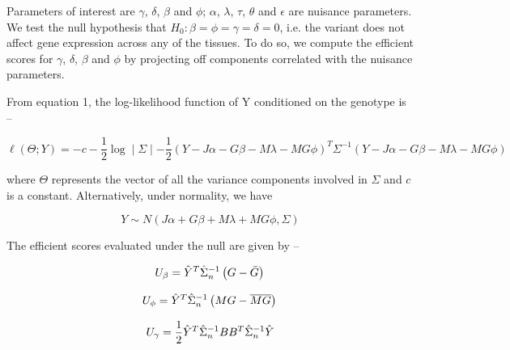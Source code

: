\documentclass[hidelinks]{article}
\begin{document}
Parameters of interest are $\gamma$, $\delta$, $\beta$ and $\phi$; $\alpha$, $\lambda$, $\tau$, $\theta$ and $\epsilon$ are nuisance parameters. We test the null hypothesis that $H_0: \beta = \phi = \gamma =  \delta = 0$, i.e. the variant does not affect gene expression across any of the tissues. To do so, we compute the efficient scores for $\gamma$, $\delta$, $\beta$ and $\phi$ by projecting off components correlated with the nuisance parameters. 


%
%

From equation 1, the log-likelihood function of Y conditioned on the genotype is --

\begin{equation}
\ell \left( \Theta ;Y \right) =  - c - \frac{1}{2} \log \mid \Sigma \mid - \frac{1}{2} \left( Y  - J \alpha - G\beta - M\lambda - MG\phi \right )^T \Sigma ^{-1} \left( Y  - J \alpha - G\beta - M\lambda - MG\phi \right )
\end{equation}

where $\Theta$ represents the vector of all the variance components involved in $\Sigma$ and $c$ is a constant. Alternatively, under normality, we have

\[
Y \sim N( J\alpha + G\beta + M\lambda + MG\phi,\Sigma )
\]

The efficient scores evaluated under the null are given by --

\begingroup
\large
\begin{equation*}
U_\beta = \hat{Y}^T \hat{\Sigma}_n^{-1} \left( G - \bar{G} \right) \\
\end{equation*}
\endgroup

\begingroup
\large
\begin{equation*}
U_\phi = \hat{Y}^T \hat{\Sigma}_n^{-1} \left( MG - \overline{MG} \right) \\
\end{equation*}
\endgroup

\begingroup
\large
\begin{equation*}
U_\gamma = \frac{1}{2} \hat{Y}^T \hat{\Sigma}_n^{-1} BB^T \hat{\Sigma}_n^{-1} \hat{Y} \\
\end{equation*}
\endgroup
\end{document}
